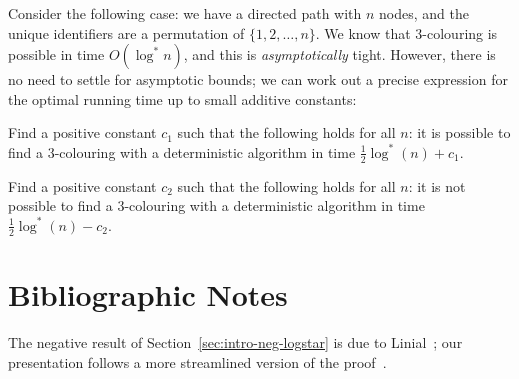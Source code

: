 \begin{exs}
    Consider the following case: we have a directed path with $n$ nodes, and the unique identifiers are a permutation of $\{1,2,\dotsc,n\}$. We know that $3$-colouring is possible in time $O(\log^* n)$, and this is \emph{asymptotically} tight. However, there is no need to settle for asymptotic bounds; we can work out a precise expression for the optimal running time up to small additive constants:
    \begin{subex}
        \item Find a positive constant $c_1$ such that the following holds for all $n$: it is possible to find a $3$-colouring with a deterministic algorithm in time $\frac{1}{2} \log^*(n) + c_1$.
        \item Find a positive constant $c_2$ such that the following holds for all $n$: it is not possible to find a $3$-colouring with a deterministic algorithm in time $\frac{1}{2} \log^*(n) - c_2$.
    \end{subex}
\end{exs}


\section{Bibliographic Notes}

The negative result of Section~\ref{sec:intro-neg-logstar} is due to Linial~\cite{linial92locality}; our presentation follows a more streamlined version of the proof~\cite{laurinharju14linial-easy}.

